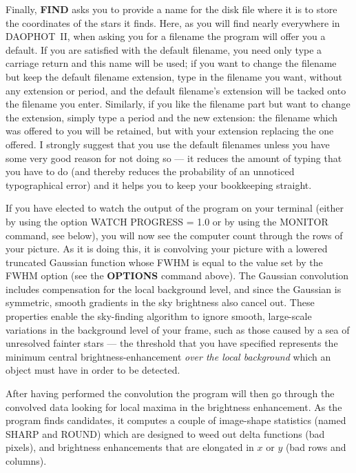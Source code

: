 Finally, {\bf FIND} asks you to provide a name for the disk file where
it is to store the coordinates of the stars it finds.  Here, as you
will find nearly everywhere in DAOPHOT~II, when asking you for a
filename the program will offer you a default.  If you are satisfied
with the default filename, you need only type a carriage return and
this name will be used; if you want to change the filename but keep the
default filename extension, type in the filename you want, without any
extension or period, and the default filename's extension will be
tacked onto the filename you enter.  Similarly, if you like the
filename part but want to change the extension, simply type a period
and the new extension: the filename which was offered to you will be
retained, but with your extension replacing the one offered.  I
strongly suggest that you use the default filenames unless you have
some very good reason for not doing so --- it reduces the amount of
typing that you have to do (and thereby reduces the probability of an
unnoticed typographical error) and it helps you to keep your
bookkeeping straight.

If you have elected to watch the output of the program on your terminal
(either by using the option WATCH PROGRESS = 1.0 or by using the
MONITOR command, see below), you will now see the computer count
through the rows of your picture.  As it is doing this, it is
convolving your picture with a lowered truncated Gaussian function
whose FWHM is equal to the value set by the FWHM option (see the {\bf
OPTIONS} command above).  The Gaussian convolution includes
compensation for the local background level, and since the Gaussian is
symmetric, smooth gradients in the sky brightness also cancel out.
These properties enable the sky-finding algorithm to ignore smooth,
large-scale variations in the background level of your frame, such as
those caused by a sea of unresolved fainter stars --- the threshold
that you have specified represents the minimum central
brightness-enhancement {\it over the local background\/} which an
object must have in order to be detected.

After having performed the convolution the program will then go through
the convolved data looking for local maxima in the brightness
enhancement. As the program finds candidates, it computes a couple of
image-shape statistics (named SHARP and ROUND) which are designed to
weed out delta functions (bad pixels), and brightness enhancements that
are elongated in $x$ or $y$ (bad rows and columns).

